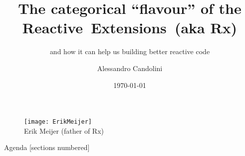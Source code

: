 \documentclass[10pt]{beamer}
\title{The categorical ``flavour'' of the \mbox{Reactive Extensions }(aka Rx)}
\subtitle{and how it can help us building better reactive code}
\date{\today}
\author[A. Candolini]{Alessandro Candolini}
\begin{document}
\maketitle

\begin{frame}%
	\begin{figure}
	\centering
		\texttt{[image: ErikMeijer]}
		\\
		{Erik Meijer (father of Rx)}
	\end{figure}
\end{frame}

\begin{frame}{Agenda}
  [sections numbered]
  \tableofcontents[hideallsubsections]
\end{frame}
\end{document}

